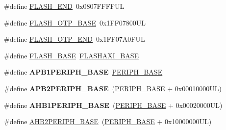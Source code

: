 \begin{DoxyCompactItemize}
\item 
\#define \mbox{\hyperlink{group___peripheral__memory__map_ga8be554f354e5aa65370f6db63d4f3ee4}{F\+L\+A\+S\+H\+\_\+\+E\+ND}}~0x0807\+F\+F\+F\+F\+UL
\item 
\#define \mbox{\hyperlink{group___peripheral__memory__map_ga91d296a67aec0da8f31c368cbc0eea94}{F\+L\+A\+S\+H\+\_\+\+O\+T\+P\+\_\+\+B\+A\+SE}}~0x1\+F\+F07800\+UL
\item 
\#define \mbox{\hyperlink{group___peripheral__memory__map_ga5bec9c5a91e312fca36f256f508ceee1}{F\+L\+A\+S\+H\+\_\+\+O\+T\+P\+\_\+\+E\+ND}}~0x1\+F\+F07\+A0\+F\+UL
\item 
\#define \mbox{\hyperlink{group___peripheral__memory__map_ga23a9099a5f8fc9c6e253c0eecb2be8db}{F\+L\+A\+S\+H\+\_\+\+B\+A\+SE}}~\mbox{\hyperlink{group___peripheral__memory__map_gac3b4a5c22d8538b98de5a11301cd1a47}{F\+L\+A\+S\+H\+A\+X\+I\+\_\+\+B\+A\+SE}}
\item 
\mbox{\label{group___peripheral__memory__map_ga45666d911f39addd4c8c0a0ac3388cfb}} 
\#define {\bfseries A\+P\+B1\+P\+E\+R\+I\+P\+H\+\_\+\+B\+A\+SE}~\mbox{\hyperlink{group___peripheral__memory__map_ga9171f49478fa86d932f89e78e73b88b0}{P\+E\+R\+I\+P\+H\+\_\+\+B\+A\+SE}}
\item 
\mbox{\label{group___peripheral__memory__map_ga25b99d6065f1c8f751e78f43ade652cb}} 
\#define {\bfseries A\+P\+B2\+P\+E\+R\+I\+P\+H\+\_\+\+B\+A\+SE}~(\mbox{\hyperlink{group___peripheral__memory__map_ga9171f49478fa86d932f89e78e73b88b0}{P\+E\+R\+I\+P\+H\+\_\+\+B\+A\+SE}} + 0x00010000\+U\+L)
\item 
\mbox{\label{group___peripheral__memory__map_ga811a9a4ca17f0a50354a9169541d56c4}} 
\#define {\bfseries A\+H\+B1\+P\+E\+R\+I\+P\+H\+\_\+\+B\+A\+SE}~(\mbox{\hyperlink{group___peripheral__memory__map_ga9171f49478fa86d932f89e78e73b88b0}{P\+E\+R\+I\+P\+H\+\_\+\+B\+A\+SE}} + 0x00020000\+U\+L)
\item 
\#define \mbox{\hyperlink{group___peripheral__memory__map_gaeedaa71d22a1948492365e2cd26cfd46}{A\+H\+B2\+P\+E\+R\+I\+P\+H\+\_\+\+B\+A\+SE}}~(\mbox{\hyperlink{group___peripheral__memory__map_ga9171f49478fa86d932f89e78e73b88b0}{P\+E\+R\+I\+P\+H\+\_\+\+B\+A\+SE}} + 0x10000000\+U\+L)
\item 
\mbox{\label{group___peripheral__memory__map_ga00d0fe6ad532ab32f0f81cafca8d3aa5}} 

\end{DoxyCompactItemize}
